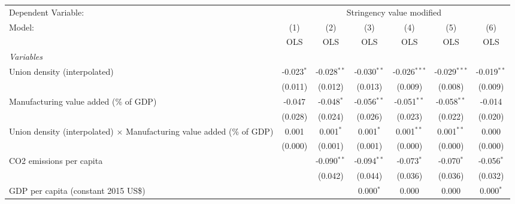 
\begingroup
\centering
\begin{tabular}{lcccccc}
   \toprule
   Dependent Variable: & \multicolumn{6}{c}{Stringency value modified}\\
   Model:                                                                        & (1)          & (2)           & (3)           & (4)            & (5)            & (6)\\  
                                                                                 &  OLS         & OLS           & OLS           & OLS            & OLS            & OLS\\  
   \midrule
   \emph{Variables}\\
   Union density (interpolated)                                                  & -0.023$^{*}$ & -0.028$^{**}$ & -0.030$^{**}$ & -0.026$^{***}$ & -0.029$^{***}$ & -0.019$^{**}$\\   
                                                                                 & (0.011)      & (0.012)       & (0.013)       & (0.009)        & (0.008)        & (0.009)\\   
   Manufacturing value added (\% of GDP)                                         & -0.047       & -0.048$^{*}$  & -0.056$^{**}$ & -0.051$^{**}$  & -0.058$^{**}$  & -0.014\\   
                                                                                 & (0.028)      & (0.024)       & (0.026)       & (0.023)        & (0.022)        & (0.020)\\   
   Union density (interpolated) $\times$ Manufacturing value added (\% of GDP)   & 0.001        & 0.001$^{*}$   & 0.001$^{*}$   & 0.001$^{**}$   & 0.001$^{**}$   & 0.000\\   
                                                                                 & (0.000)      & (0.001)       & (0.001)       & (0.000)        & (0.000)        & (0.000)\\   
   CO2 emissions per capita                                                      &              & -0.090$^{**}$ & -0.094$^{**}$ & -0.073$^{*}$   & -0.070$^{*}$   & -0.056$^{*}$\\   
                                                                                 &              & (0.042)       & (0.044)       & (0.036)        & (0.036)        & (0.032)\\   
   GDP per capita (constant 2015 US\$)                                           &              &               & 0.000$^{*}$   & 0.000          & 0.000          & 0.000$^{*}$\\   

\end{tabular}

